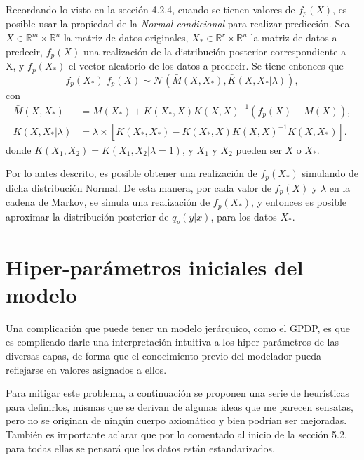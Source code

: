 Recordando lo visto en la secci\'on 4.2.4, cuando se tienen valores de $f_p(X)$, es posible usar la propiedad de la \textit{Normal condicional} para realizar predicci\'on. Sea $X \in \mathbb{R}^m \times \mathbb{R}^n$ la matriz de datos originales, $X_* \in \mathbb{R}^r \times \mathbb{R}^n$ la matriz de datos a predecir, $f_p(X)$ una realizaci\'on de la distribuci\'on posterior correspondiente a X, y $f_p(X_*)$ el vector aleatorio de los datos a predecir. Se tiene entonces que 
\begin{equation*}
    f_p(X_*)|f_p(X) 
    \sim \mathcal{N}
    (\bar{M}(X,X_*),\bar{K}(X,X_*|\lambda)),
\end{equation*}
con
\begin{equation*}
\begin{aligned}
    \bar{M}(X,X_*) &= M(X_*) + K(X_*,X)K(X,X)^{-1}(f_p(X) - M(X)), \\
    \bar{K}(X,X_*|\lambda) &= 
    \lambda
    \times
    \left[
    K(X_*,X_*) -
    K(X_*,X)K(X,X)^{-1}K(X,X_*)
    \right]
    .
\end{aligned}
\end{equation*}
donde $K(X_1,X_2) = K(X_1,X_2|\lambda=1)$, y $X_1$ y $X_2$ pueden ser $X$ o $X_*$.

Por lo antes descrito, es posible obtener una realizaci\'on de $f_p(X_*)$ simulando de dicha distribuci\'on Normal. De esta manera, por cada valor de $f_p(X)$ y $\lambda$ en la cadena de Markov, se simula una realizaci\'on de $f_p(X_*)$, y entonces es posible aproximar la distribuci\'on posterior de $q_p(y|x)$, para los datos $X_*$.

\section{Hiper-par\'ametros iniciales del modelo}

Una complicaci\'on que puede tener un modelo jer\'arquico, como el GPDP, es que es complicado darle una interpretaci\'on intuitiva a los hiper-par\'ametros de las diversas capas, de forma que el conocimiento previo del modelador pueda reflejarse en valores asignados a ellos.

Para mitigar este problema, a continuaci\'on se proponen una serie de heur\'isticas para definirlos, mismas que se derivan de algunas ideas que me parecen sensatas, pero no se originan de ning\'un cuerpo axiom\'atico y bien podr\'ian ser mejoradas. Tambi\'en es importante aclarar que por lo comentado al inicio de la secci\'on 5.2, para todas ellas se pensar\'a que los datos est\'an estandarizados.

